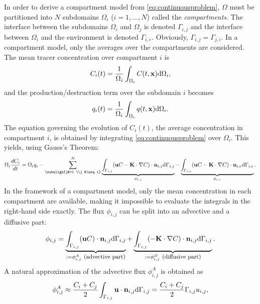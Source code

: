 In order to derive a compartment model from \eqref{eq:continuousproblem}, $\Omega$ must be partitioned into $N$ subdomains $\Omega_i$ ($i = 1,\dots,N$) called the \textit{compartments}. The interface between the subdomains $\Omega_i$ and $\Omega_j$ is denoted $\Gamma_{i,j}$ and the interface between $\Omega_i$ and the environment is denoted $\Gamma_{i,e}$. Obviously, $\Gamma_{i,j} = \Gamma_{j,i}$. In a compartment model, only the averages over the compartments are considered. The mean tracer concentration over compartment $i$ is 
\begin{equation}
	C_i(t) = \frac{1}{\Omega_i} \int_{\Omega_i} C(t,\mathbf x) \mathrm d\Omega_i,
\end{equation}
and the production/destruction term over the subdomain $i$ becomes
\begin{equation}
	q_i(t) =  \frac{1}{\Omega_i} \int_{\Omega_i} q(t,\mathbf x) \mathrm d\Omega_i.
\end{equation}
The equation governing the evolution of $C_i(t)$, the average concentration in compartment $i$, is obtained by integrating \eqref{eq:continuousproblem} over $\Omega_i$. This yields, using Gauss's Theorem:
\begin{equation}
	\Omega_i \frac{d C_i}{d t} = \Omega_i q_i - \sum_{\subalign{j&=1 \\j &\neq i}}^N \underbrace{\int_{\Gamma_{i,j}} (\b u C - \b K \cdot \nabla C)\cdot \b n_{i,j} \rm d\Gamma_{i,j}}_{\phi_{i,j}} - \underbrace{\int_{\Gamma_{i,e}} (\b u C - \b K \cdot \nabla C)\cdot \b n_{i,e} \rm d\Gamma_{i,e}}_{\phi_{i,e}}.
\end{equation}
In the framework of a compartment model, only the mean concentration in each compartment are available, making it impossible to evaluate the integrals in the right-hand side exactly. The flux $\phi_{i,j}$ can be split into an advective and a diffusive part:
\begin{equation} \label{eq:phi_i,j}
	\phi_{i,j} = \underbrace{\int_{\Gamma_{i,j}} (\mathbf u C)\cdot \mathbf n_{i,j} \mathrm d\Gamma_{i,j}}_{:= \phi_{i,j}^A \mbox{ \footnotesize (advective part)}} + \underbrace{\int_{\Gamma_{i,j}} (-\mathbf K \cdot \nabla C)\cdot \mathbf n_{i,j} \mathrm d\Gamma_{i,j}}_{:= \phi_{i,j}^D \mbox{ \footnotesize (diffusive part)}}.
\end{equation} 
A natural approximation of the advective flux $\phi_{i,j}^A$ is obtained as
\begin{equation}
	\phi_{i,j}^A \approx \frac{C_i + C_j}{2} \int_{\Gamma_{i,j}} \mathbf u \cdot \mathbf n_{i,j} \mathrm d\Gamma_{i,j} =  \frac{C_i + C_j}{2} \Gamma_{i,j} u_{i,j},
\end{equation}
